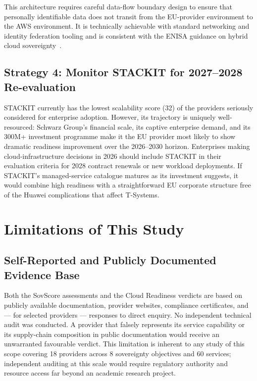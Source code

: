 This architecture requires careful data-flow boundary design to ensure that personally identifiable data does not transit from the EU-provider environment to the AWS environment. It is technically achievable with standard networking and identity federation tooling and is consistent with the ENISA guidance on hybrid cloud sovereignty~\cite{ENISA_EUCS_2023}.

\subsection{Strategy 4: Monitor STACKIT for 2027--2028 Re-evaluation}

STACKIT currently has the lowest scalability score (32) of the providers seriously considered for enterprise adoption. However, its trajectory is uniquely well-resourced: Schwarz Group's financial scale, its captive enterprise demand, and its \texteuro{}300M+ investment programme make it the EU provider most likely to show dramatic readiness improvement over the 2026--2030 horizon. Enterprises making cloud-infrastructure decisions in 2026 should include STACKIT in their evaluation criteria for 2028 contract renewals or new workload deployments. If STACKIT's managed-service catalogue matures as its investment suggests, it would combine high readiness with a straightforward EU corporate structure free of the Huawei complications that affect T-Systems.

\section{Limitations of This Study}
\label{sec:limitations}

\subsection{Self-Reported and Publicly Documented Evidence Base}

Both the SovScore assessments and the Cloud Readiness verdicts are based on publicly available documentation, provider websites, compliance certificates, and — for selected providers — responses to direct enquiry. No independent technical audit was conducted. A provider that falsely represents its service capability or its supply-chain composition in public documentation would receive an unwarranted favourable verdict. This limitation is inherent to any study of this scope covering 18 providers across 8 sovereignty objectives and 60 services; independent auditing at this scale would require regulatory authority and resource access far beyond an academic research project.

